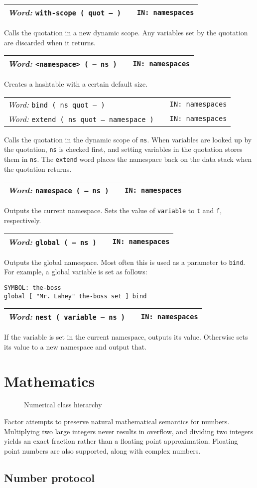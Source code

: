\documentclass{report}
\newcommand{\ordinaryword}[3]{\index{#1}
\emph{Word:} \texttt{#2} &&\texttt{IN: #3}}
\newcommand{\wordtable}[1]{

\begin{tabularx}{12cm}[t]{lXr}
\hline
#1\\
\hline
\end{tabularx}

}
\begin{document}
\wordtable{
\ordinaryword{with-scope}{with-scope ( quot -- )}{namespaces}
}
Calls the quotation in a new dynamic scope. Any variables set by the quotation are discarded when it returns.
\wordtable{
\ordinaryword{<namespace>}{<namespace> ( -- ns )}{namespaces}
}
Creates a hashtable with a certain default size.
\wordtable{
\ordinaryword{bind}{bind ( ns quot -- )}{namespaces}\\
\ordinaryword{extend}{extend ( ns quot -- namespace )}{namespaces}
}
Calls the quotation in the dynamic scope of \texttt{ns}. When variables are looked up by the quotation, \texttt{ns} is checked first, and setting variables in the quotation stores them in \texttt{ns}. The \texttt{extend} word places the namespace back on the data stack when the quotation returns.
\wordtable{
\ordinaryword{namespace}{namespace ( -- ns )}{namespaces}
}
Outputs the current namespace.
Sets the value of \texttt{variable} to \texttt{t} and \texttt{f}, respectively.
\wordtable{
\ordinaryword{global}{global ( -- ns )}{namespaces}
}
Outputs the global namespace. Most often this is used as a parameter to \texttt{bind}. For example, a global variable is set as follows:
\begin{verbatim}
SYMBOL: the-boss
global [ "Mr. Lahey" the-boss set ] bind
\end{verbatim}
\wordtable{
\ordinaryword{nest}{nest ( variable -- ns )}{namespaces}
}
If the variable is set in the current namespace, outputs its value. Otherwise sets its value to a new namespace and output that.

\section{Mathematics}

\numberglos

\begin{figure}
\caption{Numerical class hierarchy}
\begin{center}
\end{center}
\end{figure}

Factor attempts to preserve natural mathematical semantics for numbers. Multiplying two large integers never results in overflow, and dividing two integers yields an exact fraction rather than a floating point approximation. Floating point numbers are also supported, along with complex numbers.

\subsection{Number protocol}
\end{document}
